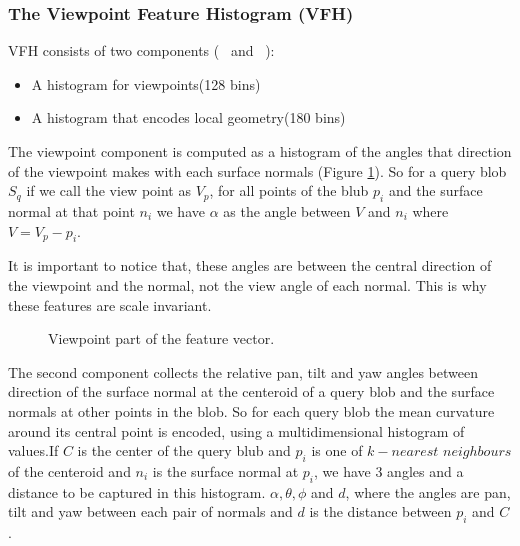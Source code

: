 \subsubsection*{The Viewpoint Feature Histogram (VFH)}
\label{VFH.ssec}
 

VFH consists of two components (~\cite{VFH_Definition} and ~\cite{5651280}):


\begin{itemize}
 \item A histogram for viewpoints(128 bins)
 \item A histogram that encodes local geometry(180 bins)
\end{itemize}

The viewpoint component is computed as a histogram of the angles that direction of the viewpoint  makes with each surface
normals (Figure \ref{VFH_ViewPoint_component.figure}). So for a query blob $S_q$ if we call the view point as $V_p$, for all points of the blub $p_i$ and the surface normal at that point $n_i$ we have $\alpha$ as the angle between $V$ and $n_i$ where $V = V_p - p_i$.


It is important to notice that, these angles are between the central direction of the viewpoint and the normal, not the view angle of
each normal. This is why these features are scale invariant.  

\begin{figure}[t]
  \caption[ViewPoint Component of VFH]
  {Viewpoint part of the feature vector.\cite{VFH_Definition}}
  \label{VFH_ViewPoint_component.figure}
\end{figure}

The second component collects the relative pan, tilt and yaw angles between direction of 
the surface normal at the centeroid of a query blob and the surface normals at other points in the blob.
So for each query blob the mean curvature around its central point is encoded, using a multidimensional histogram of values.If $C$ is the center of the query blub and $p_i$ is one of $k-nearest$ $neighbours$ of the centeroid and $n_i$ is the surface normal at $p_i$, we have 3 angles and a distance to be captured in this histogram. $\alpha,\theta, \phi$ and $d$, where the angles are pan, tilt and yaw between each pair of normals and $d$ is the distance between $p_i$ and $C$.  



